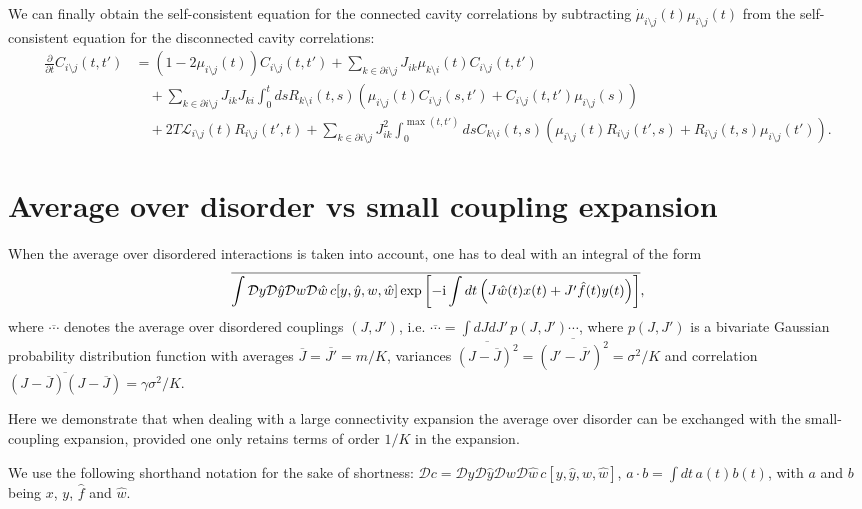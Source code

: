 \documentclass[
    preprint,
    linenumbers,
    amsmath,amssymb,amsfonts,
    aps, physrev,
    superscriptaddress,
    10pt,
    bibnotes
    ]{revtex4-2}
\begin{document}
We can finally obtain the self-consistent equation for the connected cavity correlations by subtracting $\dot{\mu}_{i\setminus j}(t)\mu_{i\setminus j}(t)$ from the self-consistent equation for the disconnected cavity correlations:
\begin{align}
  \frac{\partial}{\partial t}C_{i\setminus j}(t,t') & = \left(1 - 2 \mu_{i\setminus j}(t) \right) C_{i\setminus j}(t,t') + \sum_{k\in\partial i \setminus j}J_{ik}\mu_{k\setminus i}(t)C_{i\setminus j}(t,t') \nonumber\\
  & \quad + \sum_{k\in \partial i \setminus j}J_{ik}J_{ki}\int_0^t ds R_{k\setminus i}(t,s)\left(\mu_{i\setminus j}(t)C_{i\setminus j}(s,t') + C_{i\setminus j}(t,t')\mu_{i\setminus j}(s)\right) \nonumber \\
  & \quad + 2T \mathcal{L}_{i\setminus j}(t)R_{i\setminus j}(t',t) + \sum_{k\in \partial i \setminus j} J_{ik}^2 \int_0^{{\max (t,t')}} ds C_{k\setminus i}(t,s) \left(\mu_{i\setminus j}(t) R_{i\setminus j}(t',s) + R_{i\setminus j}(t,s) \mu_{i\setminus j}(t') \right).
\end{align}


\section{Average over disorder vs small coupling expansion}
When the average over disordered interactions is taken into account, one has to deal with an integral of the form
\begin{equation}
  \overline{\int \mathcal{D}y \mathcal{D}\hat{y} \mathcal{D}w \mathcal{D}\hat{w}\,c[y,\hat{y},w,\hat{w}] \exp{\left[-{\rm i}\int dt \left(J\hat{w}(t)x(t) + J'\hat{f}(t) y(t) \right)\right]}},
\end{equation}
where $\overline{\cdots}$ denotes the average over disordered couplings $(J,J')$, i.e. $\overline{\cdots}=\int dJdJ'\,p(J,J')\cdots$, where $p(J,J')$ is a bivariate Gaussian probability distribution function with averages $\overline{J}=\overline{J'}=m/K$, variances  $\overline{(J-\overline{J})^2}=\overline{(J'-\overline{J'})^2}=\sigma^2/K$ and correlation $\overline{(J-\overline{J})(J-\overline{J})}=\gamma \sigma^2/K$.

Here we demonstrate that when dealing with a large connectivity expansion the average over disorder can be exchanged with the small-coupling expansion, provided one only retains terms of order $1/K$ in the expansion.

We use the following shorthand notation for the sake of shortness: $\mathcal{D}c=\mathcal{D}y \mathcal{D}\hat{y} \mathcal{D}w \mathcal{D}\hat{w}\,c[y,\hat{y},w,\hat{w}]$, $a\cdot b = \int dt\, a(t) b(t)$, with $a$ and $b$ being $x$, $y$, $\hat{f}$ and $\hat{w}$.
\end{document}

